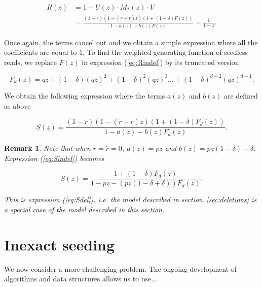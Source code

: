 \documentclass{article}
\newtheorem{remark}{Remark}
\begin{document}
\begin{equation}
\label{eq:Rindel}
\begin{split}
R(z) &= 1 + U(z) \cdot M_*(z) \cdot V \\
&= \frac{(1-r)\left( 1-(\tilde{r}-r)z \right)
\left(1+(1-\delta)F(z) \right)}{1-a(z)-b(z)F(z)}
= \frac{1}{1-z}.
\end{split}
\end{equation}

Once again, the terms cancel out and we obtain a simple expression where
all the coefficients are equal to $1$. To find the weighted generating
function of seedless reads, we replace $F(z)$ in expression
(\ref{eq:Rindel}) by its truncated version

\begin{equation*}
F_d(z) = qz + (1-\delta)(qz)^2 + (1-\delta)^2(qz)^3 \ldots +
(1-\delta)^{d-2}(qz)^{d-1}.
\end{equation*}

We obtain the following expression where the terms $a(z)$ and $b(z)$ are
defined as above

\begin{equation}
\label{eq:Sindel}
S(z) = \frac{(1-r)\left( 1-(\tilde{r}-r)z \right) \left(1+(1-\delta)F_d(z)
\right)}{1-a(z)-b(z)F_d(z)}.
\end{equation}

\begin{remark}
Note that when $r = \tilde{r} = 0$, $a(z) = pz$ and $b(z) = pz(1-\delta) +
\delta$. Expression (\ref{eq:Sindel}) becomes

\begin{equation*}
S(z) = \frac{1 + (1-\delta)F_d(z)}{1-pz-(pz(1-\delta+\delta))F_d(z)}.
\end{equation*}

This is expression (\ref{eq:Sdel}), \textit{i.e.} the model described in
section~\ref{sec:deletions} is a special case of the model described in
this section.
\end{remark}









\section{Inexact seeding}

We now consider a more challenging problem. The ongoing development of
algorithms and data structures allows us to use...
\end{document}
